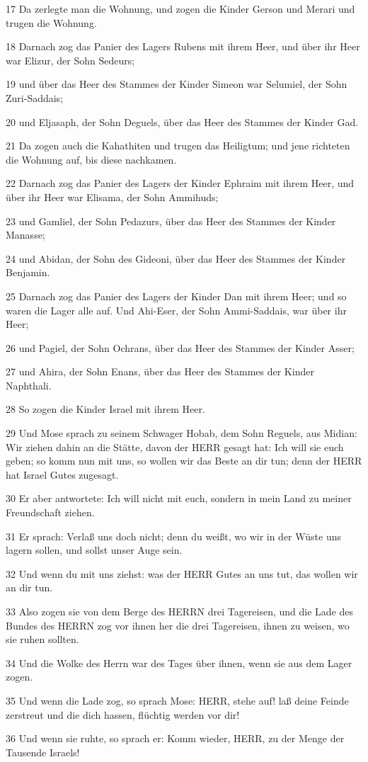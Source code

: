 \par 17 Da zerlegte man die Wohnung, und zogen die Kinder Gerson und Merari und trugen die Wohnung.
\par 18 Darnach zog das Panier des Lagers Rubens mit ihrem Heer, und über ihr Heer war Elizur, der Sohn Sedeurs;
\par 19 und über das Heer des Stammes der Kinder Simeon war Selumiel, der Sohn Zuri-Saddais;
\par 20 und Eljasaph, der Sohn Deguels, über das Heer des Stammes der Kinder Gad.
\par 21 Da zogen auch die Kahathiten und trugen das Heiligtum; und jene richteten die Wohnung auf, bis diese nachkamen.
\par 22 Darnach zog das Panier des Lagers der Kinder Ephraim mit ihrem Heer, und über ihr Heer war Elisama, der Sohn Ammihuds;
\par 23 und Gamliel, der Sohn Pedazurs, über das Heer des Stammes der Kinder Manasse;
\par 24 und Abidan, der Sohn des Gideoni, über das Heer des Stammes der Kinder Benjamin.
\par 25 Darnach zog das Panier des Lagers der Kinder Dan mit ihrem Heer; und so waren die Lager alle auf. Und Ahi-Eser, der Sohn Ammi-Saddais, war über ihr Heer;
\par 26 und Pagiel, der Sohn Ochrans, über das Heer des Stammes der Kinder Asser;
\par 27 und Ahira, der Sohn Enans, über das Heer des Stammes der Kinder Naphthali.
\par 28 So zogen die Kinder Israel mit ihrem Heer.
\par 29 Und Mose sprach zu seinem Schwager Hobab, dem Sohn Reguels, aus Midian: Wir ziehen dahin an die Stätte, davon der HERR gesagt hat: Ich will sie euch geben; so komm nun mit uns, so wollen wir das Beste an dir tun; denn der HERR hat Israel Gutes zugesagt.
\par 30 Er aber antwortete: Ich will nicht mit euch, sondern in mein Land zu meiner Freundschaft ziehen.
\par 31 Er sprach: Verlaß uns doch nicht; denn du weißt, wo wir in der Wüste uns lagern sollen, und sollst unser Auge sein.
\par 32 Und wenn du mit uns ziehst: was der HERR Gutes an uns tut, das wollen wir an dir tun.
\par 33 Also zogen sie von dem Berge des HERRN drei Tagereisen, und die Lade des Bundes des HERRN zog vor ihnen her die drei Tagereisen, ihnen zu weisen, wo sie ruhen sollten.
\par 34 Und die Wolke des Herrn war des Tages über ihnen, wenn sie aus dem Lager zogen.
\par 35 Und wenn die Lade zog, so sprach Mose: HERR, stehe auf! laß deine Feinde zerstreut und die dich hassen, flüchtig werden vor dir!
\par 36 Und wenn sie ruhte, so sprach er: Komm wieder, HERR, zu der Menge der Tausende Israels!

